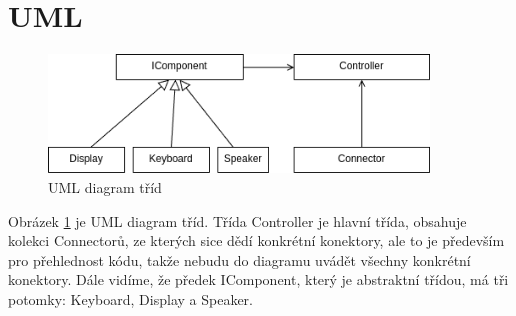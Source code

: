 
\section{UML}
\begin{figure}[h!]
	\centering
	\includegraphics[width=0.9\textwidth]{pictures/diagram.png}
    	\caption{UML diagram tříd}
   	\label{fig:uml}
\end{figure}

Obrázek \ref{fig:uml} je UML diagram tříd. Třída Controller je hlavní třída, obsahuje kolekci Connectorů, ze kterých sice dědí konkrétní konektory, ale to je především pro přehlednost kódu, takže nebudu do diagramu uvádět všechny konkrétní konektory. Dále vidíme, že předek IComponent, který je abstraktní třídou, má tři potomky: Keyboard, Display a Speaker.